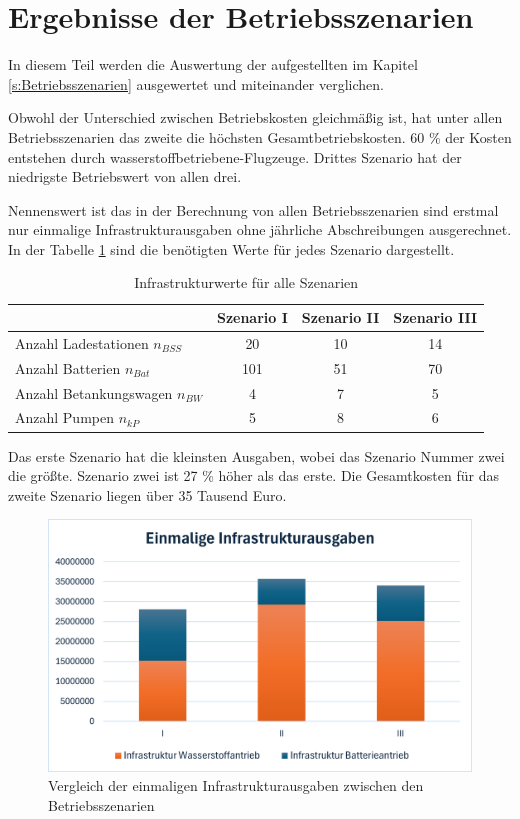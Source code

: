 \section{Ergebnisse der Betriebsszenarien}
In diesem Teil werden die Auswertung der aufgestellten im Kapitel \ref{s:Betriebsszenarien} ausgewertet und miteinander verglichen.

Obwohl der Unterschied zwischen Betriebskosten gleichmäßig ist, hat unter allen Betriebsszenarien das zweite die höchsten Gesamtbetriebskosten.
60 \% der Kosten entstehen durch wasserstoffbetriebene-Flugzeuge. Drittes Szenario hat der niedrigste Betriebswert von allen drei.

Nennenswert ist das in der Berechnung von allen Betriebsszenarien sind erstmal nur einmalige Infrastrukturausgaben 
ohne jährliche Abschreibungen ausgerechnet. In der Tabelle \ref{Infrastrukturwerte_res} sind die benötigten Werte für jedes Szenario dargestellt.

\begin{table}[h]
	\begin{center}
    \caption{Infrastrukturwerte für alle Szenarien}
	\label{Infrastrukturwerte_res}
	\begin{tabular}{|l|c|c|c|}
		\hline
		 & \textbf{Szenario I}& \textbf{Szenario II}& \textbf{Szenario III} \\ \hline
		Anzahl Ladestationen $n_{BSS}$ & 20 & 10& 14\\ \hline
		Anzahl Batterien $n_{Bat}$ & 101 & 51& 70 \\ \hline
		Anzahl Betankungswagen $n_{BW}$ & 4 & 7 & 5\\ \hline
		Anzahl Pumpen $n_{kP}$  & 5 & 8 & 6\\ \hline
	\end{tabular}
    \end{center}
\end{table}

Das erste Szenario hat die kleinsten Ausgaben, wobei das Szenario Nummer zwei die größte. Szenario zwei ist 27 \% höher als das erste.
Die Gesamtkosten für das zweite Szenario liegen über 35 Tausend Euro.
\begin{figure}[h]
	\centering
	\includegraphics[width=0.8\linewidth]{Bilder/Infr_Szenarien.png}
	\caption[Betriebsszenarien]{Vergleich der einmaligen Infrastrukturausgaben zwischen den Betriebsszenarien}
	\label{res_betriebsszenarien}
\end{figure}